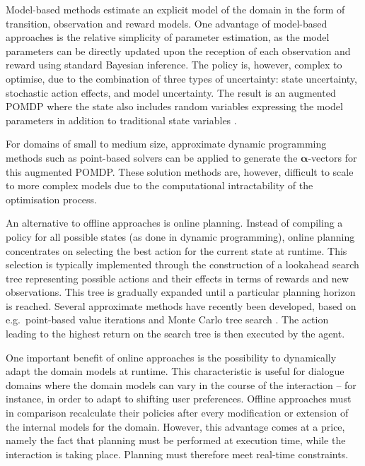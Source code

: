 Model-based methods estimate an explicit model of the domain in the form of transition, observation and reward models.  One advantage of model-based approaches is the relative simplicity of parameter estimation, as the model parameters can be directly updated upon the reception of each observation and reward using standard Bayesian inference. The policy is, however, complex to optimise, due to the combination of three types of uncertainty: state uncertainty, stochastic action effects, and model uncertainty. The result is an augmented POMDP where the state also includes random variables expressing the model parameters in addition to traditional state variables \citep{Duff:2002,Ross:2011}. 

For domains of small to medium size, approximate dynamic programming methods such as point-based solvers \citep{shani2013} can be applied to generate the $\boldsymbol\alpha$-vectors for this augmented POMDP.  These solution methods are, however, difficult to scale to more complex models due to the computational intractability of the optimisation process.    

An alternative to offline approaches is online planning.  Instead of compiling a policy for all possible states (as done in dynamic programming), online planning concentrates on selecting the best action for the current state at runtime. This selection is typically implemented through the construction of a lookahead search tree representing possible actions and their effects in terms of rewards and new observations. This tree is gradually expanded until a particular planning horizon is reached.  Several approximate methods have recently been developed, based on e.g.\ point-based value iterations \citep{ross2008} and Monte Carlo tree search \citep{NIPS2010_0740}. The action leading to the highest return on the search tree is then executed by the agent.  

One important benefit of online approaches is the possibility to dynamically adapt the domain models at runtime. This characteristic is useful for dialogue domains where the domain models can vary in the course of the interaction -- for instance, in order to adapt to shifting user preferences. Offline approaches must in comparison recalculate their policies after every modification or extension of the internal models for the domain.   However, this advantage comes at a price, namely the fact that planning must be performed at execution time, while the interaction is taking place.  Planning must therefore meet real-time constraints. 

